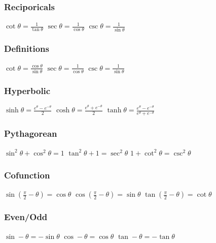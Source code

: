 \documentclass[10pt,letterpaper]{article}
\begin{document}
\begin{multicols}{2}											\subsubsection*{Reciporicals}

$ \cot \theta = \frac{1}{\tan \theta} $ \hfill
$ \sec \theta = \frac{1}{\cos \theta} $ \hfill
$ \csc \theta = \frac{1}{\sin \theta} $

															\subsubsection*{Definitions}

$ \cot \theta = \frac{\cos \theta}{\sin \theta} $ \hfill
$ \sec \theta = \frac{1}{\cos \theta} $ \hfill
$ \csc \theta = \frac{1}{\sin \theta} $

															\subsubsection*{Hyperbolic}
															
$ \sinh \theta = \frac{ e ^{\theta} - e ^{-\theta} }{ 2 } $ \hfill
$ \cosh \theta = \frac{ e ^{\theta} + e ^{-\theta} }{ 2 } $ \hfill
$ \tanh \theta = \frac{ e ^{\theta} - e ^{-\theta} }{ e ^{\theta} + e ^{-\theta} } $

															\subsubsection*{Pythagorean}

$ \sin ^{2} \theta + \cos ^{2} \theta = 1 $ \hfill
$ \tan ^{2} \theta + 1 = \sec ^{2} \theta $ \hfill
$ 1 + \cot ^{2} \theta = \csc ^{2} \theta $

															\subsubsection*{Cofunction}

$ \sin (\frac{\pi}{2} - \theta ) = \cos \theta $ \hfill
$ \cos (\frac{\pi}{2} - \theta ) = \sin \theta $ \hfill
$ \tan (\frac{\pi}{2} - \theta ) = \cot \theta $

															\subsubsection*{Even/Odd}

$ \sin -\theta = -\sin \theta $ \hfill
$ \cos -\theta = \cos \theta $ \hfill
$ \tan -\theta = -\tan \theta $


\end{multicols}
\end{document}
